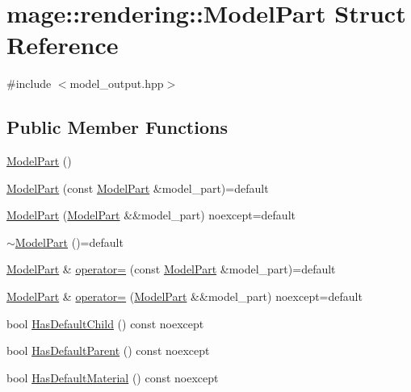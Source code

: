 \hypertarget{structmage_1_1rendering_1_1_model_part}{}\section{mage\+:\+:rendering\+:\+:Model\+Part Struct Reference}
\label{structmage_1_1rendering_1_1_model_part}


{\ttfamily \#include $<$model\+\_\+output.\+hpp$>$}

\subsection*{Public Member Functions}
\begin{DoxyCompactItemize}
\item 
\hyperlink{structmage_1_1rendering_1_1_model_part_adb7271a00583f72324ab37ab7e668689}{Model\+Part} ()
\item 
\hyperlink{structmage_1_1rendering_1_1_model_part_ab9f9bbf4d5a08113483d3744b69e7188}{Model\+Part} (const \hyperlink{structmage_1_1rendering_1_1_model_part}{Model\+Part} \&model\+\_\+part)=default
\item 
\hyperlink{structmage_1_1rendering_1_1_model_part_a843671f80d5c36d05d7d147f65fea890}{Model\+Part} (\hyperlink{structmage_1_1rendering_1_1_model_part}{Model\+Part} \&\&model\+\_\+part) noexcept=default
\item 
\hyperlink{structmage_1_1rendering_1_1_model_part_ac01c98a3cab3fb9692bebbfa6ef3fd18}{$\sim$\+Model\+Part} ()=default
\item 
\hyperlink{structmage_1_1rendering_1_1_model_part}{Model\+Part} \& \hyperlink{structmage_1_1rendering_1_1_model_part_a9d6c372839b9493df4b432d8ba2613dc}{operator=} (const \hyperlink{structmage_1_1rendering_1_1_model_part}{Model\+Part} \&model\+\_\+part)=default
\item 
\hyperlink{structmage_1_1rendering_1_1_model_part}{Model\+Part} \& \hyperlink{structmage_1_1rendering_1_1_model_part_a54950b40fa5dd12e77277669cbd6dc3a}{operator=} (\hyperlink{structmage_1_1rendering_1_1_model_part}{Model\+Part} \&\&model\+\_\+part) noexcept=default
\item 
bool \hyperlink{structmage_1_1rendering_1_1_model_part_ab4118a267808c18556b0fa10949bcb0b}{Has\+Default\+Child} () const noexcept
\item 
bool \hyperlink{structmage_1_1rendering_1_1_model_part_ac452d6bba03decae31646eec0329c4ab}{Has\+Default\+Parent} () const noexcept
\item 
bool \hyperlink{structmage_1_1rendering_1_1_model_part_aae8cebe1ec39e939b53fc3f7330984a8}{Has\+Default\+Material} () const noexcept
\end{DoxyCompactItemize}
